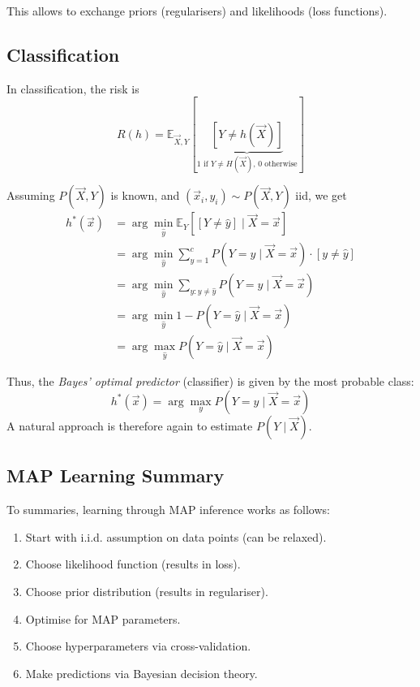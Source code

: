 This allows to exchange priors (regularisers)
and likelihoods (loss functions).


\subsection{Classification}
In classification, the risk is
\begin{equation*}
    R(h) = \mathbb{E}_{\vec{X}, Y}[
        \underbrace{[Y \neq h(\vec{X})]}_\text{$1$ if $Y \neq H(\vec{X})$, $0$ otherwise}
    ]
\end{equation*}

Assuming $P(\vec{X}, Y)$ is known,
and $(\vec{x}_i, y_i) \sim P(\vec{X}, Y)$ iid,
we get
\begin{align*}
    h^*(\vec{x}) &= \arg\min_{\hat{y}}{
        \mathbb{E}_Y[[Y \neq \hat{y}] \mid \vec{X} = \vec{x}]
    } \\
    &= \arg\min_{\hat{y}}{
        \sum_{y=1}^c{P(Y = y \mid \vec{X} = \vec{x}) \cdot [y \neq \hat{y}] }
    } \\
    &= \arg\min_{\hat{y}}{
        \sum_{y : y \neq \hat{y}}{P(Y = y \mid \vec{X} = \vec{x})}    
    } \\
    &= \arg\min_{\hat{y}}{1 - P(Y = \hat{y} \mid \vec{X} = \vec{x})} \\
    &= \arg\max_{\hat{y}}{P(Y = \hat{y} \mid \vec{X} = \vec{x})}
\end{align*}

Thus, the \emph{Bayes' optimal predictor} (classifier)
is given by the most probable class:
\begin{equation*}
    h^*(\vec{x}) = \arg\max_y{P(Y = y \mid \vec{X} = \vec{x})}
\end{equation*}
A natural approach is therefore again to estimate $P(Y \mid \vec{X})$.


\subsection{MAP Learning Summary}
To summaries, learning through MAP inference
works as follows:
\begin{enumerate}
    \item Start with i.i.d. assumption
    on data points (can be relaxed).
    \item Choose likelihood function
    (results in loss).
    \item Choose prior distribution
    (results in regulariser).
    \item Optimise for MAP parameters.
    \item Choose hyperparameters
    via cross-validation.
    \item Make predictions via Bayesian
    decision theory.
\end{enumerate}
